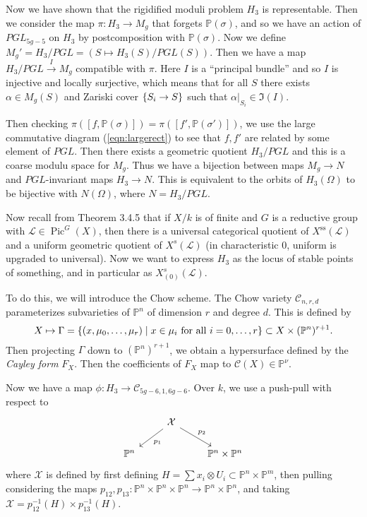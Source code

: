 \documentclass[leqno, openany]{memoir}
\theoremstyle{definition}
\theoremstyle{remark}
\theoremstyle{plain}
\theoremstyle{definition}
\theoremstyle{remark}
\renewcommand{\P}{\mathbb{P}}
\newcommand{\mc}[1]{\mathcal{#1}}
\newcommand{\mr}[1]{\mathrm{#1}}
\DeclareMathOperator{\Pic}{Pic}
\begin{document}
Now we have shown that the rigidified moduli problem $H_3$ is representable. Then we consider the map $\pi \colon H_3 \to M_g$ that forgets $\P(\sigma)$, and so we have an action of $PGL_{5g-5}$ on $H_3$ by postcomposition with $\P(\sigma)$. Now we define $M_g' = H_3 / PGL = (S \mapsto H_3(S) / PGL(S))$. Then we have a map $H_3 / PGL \xrightarrow{I} M_g$ compatible with $\pi$. Here $I$ is a ``principal bundle'' and so $I$ is injective and locally surjective, which means that for all $S$ there exists $\alpha \in M_g(S)$ and Zariski cover $\qty{S_i \to S}$ such that $\alpha|_{S_i} \in \Im(I)$.

Then checking $\pi([f, \P(\sigma)]) = \pi([f', \P(\sigma')])$, we use the large commutative diagram (\ref{eqn:largerect}) to see that $f,f'$ are related by some element of $PGL$. Then there exists a geometric quotient $H_3 / PGL$ and this is a coarse modulu space for $M_g$. Thus we have a bijection between maps $M_g \to N$ and $PGL$-invariant maps $H_3 \to N$. This is equivalent to the orbits of $H_3(\Omega)$ to be bijective with $N(\Omega)$, where $N = H_3 / PGL$.

Now recall from Theorem 3.4.5 that if $X/k$ is of finite and $G$ is a reductive group with $\mc{L} \in \Pic^G(X)$, then there is a universal categorical quotient of $X^{\mr{ss}}(\mc{L})$ and a uniform geometric quotient of $X^s(\mc{L})$ (in characteristic $0$, uniform is upgraded to universal). Now we want to express $H_3$ as the locus of stable points of something, and in particular as $X^s_{(0)}(\mc{L})$.

To do this, we will introduce the Chow scheme. The Chow variety $\mc{C}_{n, r, d}$ parameterizes subvarieties of $\P^n$ of dimension $r$ and degree $d$. This is defined by
\[ X \mapsto \Gamma = \qty{(x, \mu_0, \ldots, \mu_r) \mid x \in \mu_i \text{ for all }i = 0, \ldots, r} \subset X \times (\P^n)^{r+1}. \]
Then projecting $\Gamma$ down to $(\P^n)^{r+1}$, we obtain a hypersurface defined by the \textit{Cayley form} $F_X$. Then the coefficients of $F_X$ map to $\mc{C}(X) \in \P^{\nu}$. 

Now we have a map $\phi \colon H_3 \to \mc{C}_{5g-6, 1, 6g-6}$. Over $k$, we use a push-pull with respect to 
\begin{equation*}
\begin{tikzcd}
    & \mc{X} \arrow{dl}{p_1} \arrow{dr}{p_2} \\
    \P^n & & \P^n \times \P^n
\end{tikzcd}
\end{equation*}
where $\mc{X}$ is defined by first defining $H = \sum x_i \otimes U_i \subset \P^n \times \P^m$, then pulling considering the maps $p_{12}, p_{13} \colon \P^n \times \P^n \times \P^n \to \P^n \times \P^n$, and taking $\mc{X} = p_{12}^{-1}(H) \times p_{13}^{-1}(H)$.
\end{document}
